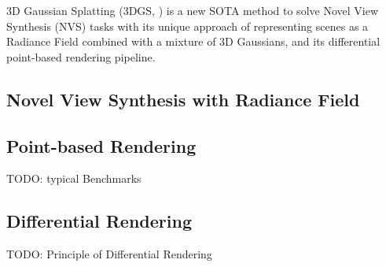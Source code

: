 3D Gaussian Splatting (3DGS, \cite{kerbl3DGaussianSplatting2023}) 
is a new SOTA method to solve Novel View Synthesis (NVS) tasks 
with its unique approach of representing scenes as a Radiance Field combined with a mixture of 3D Gaussians,
and its differential point-based rendering pipeline.

\subsection{Novel View Synthesis with Radiance Field}



\subsection{Point-based Rendering}

TODO: typical Benchmarks

\subsection{Differential Rendering}

TODO: Principle of Differential Rendering
